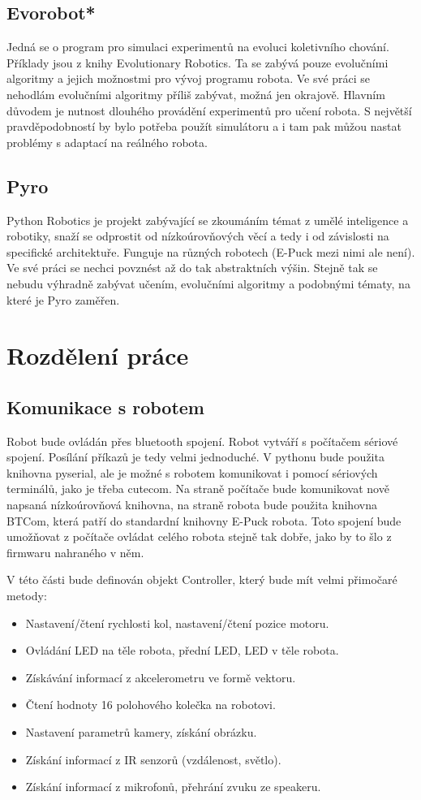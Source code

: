 \documentclass[11pt]{article}
\begin{document}
\subsection{Evorobot*}
Jedná se o program pro simulaci experimentů na evoluci koletivního chování.
Příklady jsou z knihy Evolutionary Robotics. Ta se zabývá pouze evolučními
algoritmy a jejich možnostmi pro vývoj programu robota. Ve své práci se
nehodlám evolučními algoritmy příliš zabývat, možná jen okrajově. Hlavním
důvodem je nutnost dlouhého provádění experimentů pro učení robota. S největší
pravděpodobností by bylo potřeba použít simulátoru a i tam pak můžou nastat
problémy s adaptací na reálného robota.

\subsection{Pyro}
Python Robotics je projekt zabývající se zkoumáním témat z umělé inteligence a
robotiky, snaží se odprostit od nízkoúrovňových věcí a tedy i od závislosti na
specifické architektuře. Funguje na různých robotech (E-Puck mezi nimi ale
není). Ve své práci se nechci povznést až do tak abstraktních výšin. Stejně tak
se nebudu výhradně zabývat učením, evolučními algoritmy a podobnými tématy, na
které je Pyro zaměřen.

\section{Rozdělení práce}
\subsection{Komunikace s robotem}
Robot bude ovládán přes bluetooth spojení. Robot vytváří s počítačem sériové
spojení. Posílání příkazů je tedy velmi jednoduché. V pythonu bude použita
knihovna pyserial, ale je možné s robotem komunikovat i pomocí sériových
terminálů, jako je třeba cutecom. Na straně počítače bude komunikovat nově
napsaná nízkoúrovňová knihovna, na straně robota bude použita knihovna BTCom,
která patří do standardní knihovny E-Puck robota. Toto spojení bude umožňovat z
počítače ovládat celého robota stejně tak dobře, jako by to šlo z firmwaru
nahraného v něm.

V této části bude definován objekt Controller, který bude mít velmi přimočaré metody:
\begin{itemize}
\item Nastavení/čtení rychlosti kol, nastavení/čtení pozice motoru.
\item Ovládání LED na těle robota, přední LED, LED v těle robota.
\item Získávání informací z akcelerometru ve formě vektoru.
\item Čtení hodnoty 16 polohového kolečka na robotovi.
\item Nastavení parametrů kamery, získání obrázku.
\item Získání informací z IR senzorů (vzdálenost, světlo).
\item Získání informací z mikrofonů, přehrání zvuku ze speakeru.
\end{itemize}
\end{document}
